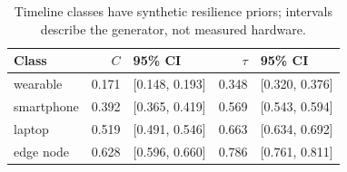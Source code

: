 \begin{table}[t]
\centering
\caption{Timeline classes have synthetic resilience priors; intervals describe the generator, not measured hardware.}
\label{tab:classes}
\par\smallskip
\footnotesize
\setlength{\tabcolsep}{3pt}
\begin{tabular}{lrlrl}
\toprule
Class & $C$ & 95\% CI & $\tau$ & 95\% CI \\
\midrule
wearable & 0.171 & [0.148, 0.193] & 0.348 & [0.320, 0.376] \\
smartphone & 0.392 & [0.365, 0.419] & 0.569 & [0.543, 0.594] \\
laptop & 0.519 & [0.491, 0.546] & 0.663 & [0.634, 0.692] \\
edge node & 0.628 & [0.596, 0.660] & 0.786 & [0.761, 0.811] \\
\bottomrule
\end{tabular}
\end{table}
